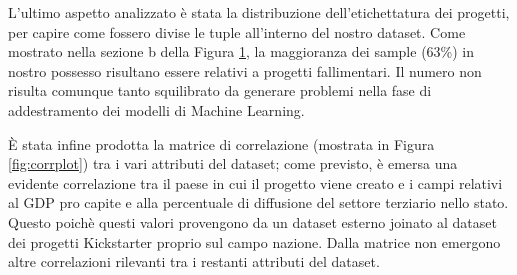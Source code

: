 L'ultimo aspetto analizzato è stata la distribuzione dell'etichettatura dei progetti, per capire come fossero divise le tuple all'interno del nostro dataset. Come mostrato nella sezione b della Figura \ref{fig:piestate}, la maggioranza dei sample (63\%) in nostro possesso risultano essere relativi a progetti fallimentari. Il numero non risulta comunque tanto squilibrato da generare problemi nella fase di addestramento dei modelli di Machine Learning.

\begin{figure}%
	\centering
	\qquad
	\caption{}%
	\label{fig:piestate}%
\end{figure}

È stata infine prodotta la matrice di correlazione (mostrata in Figura \ref{fig:corrplot}) tra i vari attributi del dataset; come previsto, è emersa una evidente correlazione tra il paese in cui il progetto viene creato e i campi relativi al GDP pro capite e alla percentuale di diffusione del settore terziario nello stato. Questo poichè questi valori provengono da un dataset esterno joinato al dataset dei progetti Kickstarter proprio sul campo nazione. Dalla matrice non emergono altre correlazioni rilevanti tra i restanti attributi del dataset.

